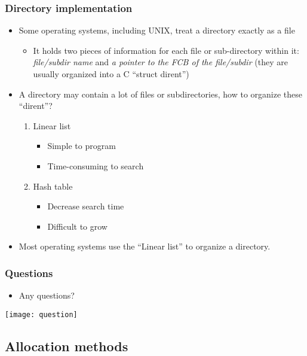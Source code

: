 \documentclass[CJKutf8,dvipsnames,table]{beamer}
\begin{document}
\begin{CJK*}{UTF8}{song}
  \begin{frame}
    \frametitle{Directory implementation} \pause
    \begin{itemize}\parskip=0pt
    \item Some operating systems, including UNIX, treat a directory exactly as a file \pause
      \begin{itemize}\parskip=0pt
      \item It holds two pieces of information for each file or sub-directory within it: \emph{file/subdir name} and \emph{a pointer to the FCB of the file/subdir} (they are usually organized into a C ``struct dirent'') \pause
      \end{itemize}
    \item A directory may contain a lot of files or subdirectories, how to organize these ``dirent''? \pause
      \begin{enumerate}\parskip=0pt
      \item Linear list \pause
        \begin{itemize}\parskip=0pt
        \item Simple to program \pause
        \item Time-consuming to search \pause
        \end{itemize}
      \item Hash table \pause
        \begin{itemize}\parskip=0pt
        \item Decrease search time \pause
        \item Difficult to grow \pause
        \end{itemize}
      \end{enumerate}
    \item Most operating systems use the ``Linear list'' to organize a directory.
    \end{itemize}
  \end{frame}
  
  \begin{frame}
    \frametitle{Questions}
    \begin{itemize}
    \item Any questions?
    \end{itemize}
    \begin{center}
      \texttt{[image: question]}
    \end{center}
  \end{frame}

  \subsection{Allocation methods}
  

\end{CJK*}
\end{document}
